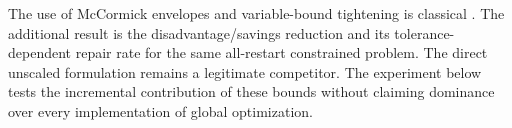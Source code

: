The use of McCormick envelopes and variable-bound tightening is classical \citep{McCormick1976}. The additional result is the disadvantage/savings reduction and its tolerance-dependent repair rate for the same all-restart constrained problem. The direct unscaled formulation remains a legitimate competitor. The experiment below tests the incremental contribution of these bounds without claiming dominance over every implementation of global optimization.
